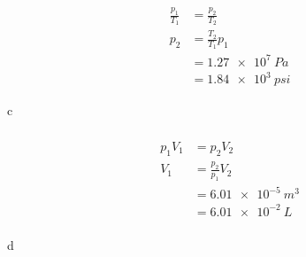 \documentclass{article}
\begin{document}
\subsubsection{}

\begin{align*}
  \frac{p_1}{T_1} & = \frac{p_2}{T_2}     \\
  p_2             & = \frac{T_2}{T_1} p_1 \\
                  & = \qty{1.27e7}{Pa}    \\
                  & = \qty{1.84e3}{psi}
\end{align*}

c

\setcounter{subsubsection}{64}
\subsubsection{}

\begin{align*}
  p_1 V_1 & = p_2 V_2             \\
  V_1     & = \frac{p_2}{p_1} V_2 \\
          & = \qty{6.01e-5}{m^3}  \\
          & = \qty{6.01e-2}{L}    \\
\end{align*}

d
\end{document}
